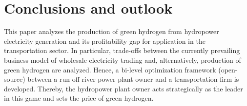 \documentclass[review]{elsarticle}
\begin{document}
%
%

\section{Conclusions and outlook}\label{conclusion}
This paper analyzes the production of green hydrogen from hydropower electricity generation and its profitability gap for application in the transportation sector. In particular, trade-offs between the currently prevailing business model of wholesale electricity trading and, alternatively, production of green hydrogen are analyzed. Hence, a bi-level optimization framework (open-source) between a run-off river power plant owner and a transportation firm is developed. Thereby, the hydropower plant owner acts strategically as the leader in this game and sets the price of green hydrogen.\vspace{0.3cm}
\end{document}
